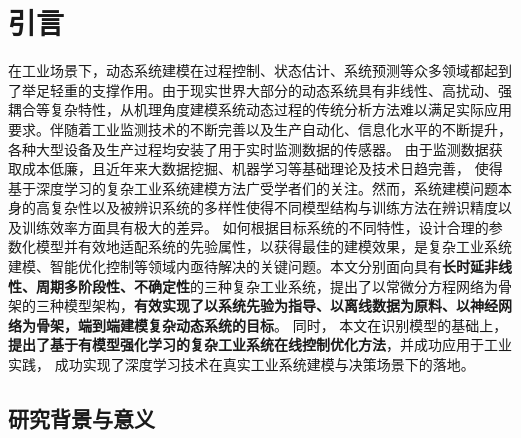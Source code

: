
\chapter{引言}

\setcounter{page}{1}
在工业场景下，动态系统建模在过程控制、状态估计、系统预测等众多领域都起到了举足轻重的支撑作用。由于现实世界大部分的动态系统具有非线性、高扰动、强耦合等复杂特性，从机理角度建模系统动态过程的传统分析方法难以满足实际应用要求。伴随着工业监测技术的不断完善以及生产自动化、信息化水平的不断提升，各种大型设备及生产过程均安装了用于实时监测数据的传感器。 
由于监测数据获取成本低廉，且近年来大数据挖掘、机器学习等基础理论及技术日趋完善，
使得基于深度学习的复杂工业系统建模方法广受学者们的关注。然而，系统建模问题本身的高复杂性以及被辨识系统的多样性使得不同模型结构与训练方法在辨识精度以及训练效率方面具有极大的差异。
如何根据目标系统的不同特性，设计合理的参数化模型并有效地适配系统的先验属性，以获得最佳的建模效果，是复杂工业系统建模、智能优化控制等领域内亟待解决的关键问题。本文分别面向具有\textbf{长时延非线性、周期多阶段性、不确定性}的三种复杂工业系统，提出了以常微分方程网络为骨架的三种模型架构，\textbf{有效实现了以系统先验为指导、以离线数据为原料、以神经网络为骨架，端到端建模复杂动态系统的目标}。
同时，
本文在识别模型的基础上，\textbf{提出了基于有模型强化学习的复杂工业系统在线控制优化方法}，并成功应用于工业实践，
成功实现了深度学习技术在真实工业系统建模与决策场景下的落地。
\section{研究背景与意义}
    




